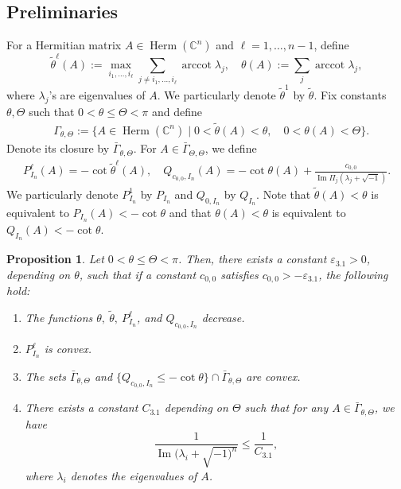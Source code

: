 \documentclass[10pt,a4paper]{amsart}
\numberwithin{equation}{section}
\newtheorem{prop}[equation]{Proposition}
\begin{document}
\subsection{Preliminaries}
For a Hermitian matrix $A\in\operatorname{Herm}(\mathbb{C}^n)$ and $\ell=1,\dots,{n-1}$, define
\begin{equation}\label{eq:thetaop}
    \tilde{\theta}^\ell(A):=\max_{i_1,\dots,i_\ell}\sum_{j\neq i_1,\dots,i_\ell} \operatorname{arccot}\lambda_j,\quad \theta(A):=\sum_j\operatorname{arccot}\lambda_j,
\end{equation}
where $\lambda_j$'s are eigenvalues of $A$. We particularly denote $\tilde{\theta}^1$ by $\tilde{\theta}.$
Fix constants $\theta,\Theta$ such that $0<\theta\le\Theta<\pi$ and define
\begin{equation}\label{eq:thetaset}
    \begin{aligned}
        &{\Gamma}_{\theta,\Theta}:=\{A\in\operatorname{Herm}(\mathbb{C}^n)\mid 0<\tilde{\theta}(A)<\theta,\quad 0<\theta(A)<\Theta\}.    \end{aligned}
\end{equation}
Denote its closure by $\bar{\Gamma}_{\theta,\Theta}$.
For $A\in\bar{\Gamma}_{\Theta,\Theta}$, we define
\begin{align*}
    P^\ell_{I_n}(A)= - \cot\tilde{\theta}^\ell(A),\quad Q_{c_{0,0},I_n}(A) = -\cot\theta(A)+\frac{c_{0,0}}{\operatorname{Im}\Pi_j(\lambda_j+\sqrt{-1})}.
\end{align*}
We particularly denote $P^1_{I_n}$ by $P_{I_n}$ and $Q_{0,I_n}$ by $Q_{I_n}$. Note that $\tilde{\theta}(A)<\theta$ is equivalent to
$P_{I_n}(A)<-\cot\theta$ and that $\theta(A)<\theta$ is equivalent to $Q_{I_n}(A)<-\cot\theta.$

\begin{prop}\label{prop:dhymproperties}
    Let $0<\theta\le\Theta<\pi$. Then, there exists a constant $\varepsilon_{3.1}>0$, depending on $\theta$, such that if a constant $c_{0,0}$ satisfies $c_{0,0}>-\varepsilon_{3.1}$, the following hold: 
    \begin{enumerate}[label={\upshape(\roman*)}]
        \item\label{item:dhymmonotonicity} The functions $\theta, \ \tilde{\theta},\ P^\ell_{I_n}$, and $Q_{c_{0,0},I_n}$ decrease.
        \item\label{item:dhympconv} $P^\ell_{I_n}$ is convex. 
        \item\label{item:dhymsublevel} The sets $\bar{\Gamma}_{\theta,\Theta}$ and $\{Q_{c_{0,0},I_n}\le -\cot\theta\}\cap\bar{\Gamma}_{\theta,\Theta}$ are convex.
        \item\label{item:dhymImest} There exists a constant $C_{3.1}$ depending on $\Theta$ such that for any $A\in\bar{\Gamma}_{\theta,\Theta}$, we have
        $$\frac{1}{\operatorname{Im}(\lambda_i+\sqrt{-1)^n}}\le\frac{1}{C_{3.1}},$$
        where $\lambda_i$ denotes the eigenvalues of $A$.
    \end{enumerate}
\end{prop}
\end{document}
